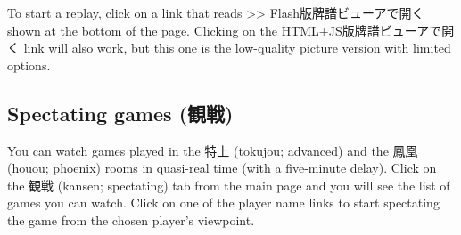\bigskip
To start a replay, click on a link that reads >> Flash版牌譜ビューアで開く shown at the bottom of the page. Clicking on the HTML+JS版牌譜ビューアで開く link will also work, but this one is the low-quality picture version with limited options. 

\subsection{Spectating games (観戦)}
You can watch games played in the 特上 ({\jap tokujou}; advanced) and the 鳳凰 ({\jap houou}; phoenix) rooms in quasi-real time (with a five-minute delay). Click on the 観戦 ({\jap kansen}; spectating) tab from the main page and you will see the list of games you can watch. Click on one of the player name links to start spectating the game from the chosen player's viewpoint. 

